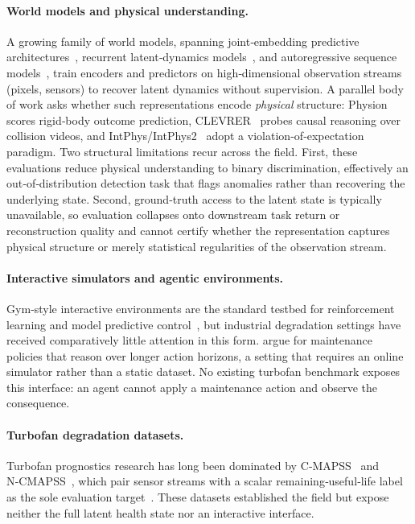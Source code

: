 \documentclass{article}
\begin{document}
\paragraph{World models and physical understanding.}
A growing family of world models, spanning joint‑embedding predictive architectures~\cite{Balestriero_LeCun_2025, Assran_Bardes_Fan_Garrido_Howes_Mojtaba_Komeili_Muckley_Rizvi_Roberts_et_al_2025, Maes_Lidec_Scieur_LeCun_Balestriero_2026}, recurrent latent‑dynamics models~\cite{okada2021dreaming, okada2022dreamingv2}, and autoregressive sequence models~\cite{wang2020data, krishnan2022self, deng2024enhancing, calabrese2021predictive}, train encoders and predictors on high‑dimensional observation streams (pixels, sensors) to recover latent dynamics without supervision. A parallel body of work asks whether such representations encode \emph{physical} structure: Physion~\cite{bear1physion} scores rigid‑body outcome prediction, CLEVRER~\cite{yiclevrer} probes causal reasoning over collision videos, and IntPhys/IntPhys2~\cite{riochet2018intphys, Bordes_Garrido_Kao_Williams_Rabbat_Dupoux_2025} adopt a violation‑of‑expectation paradigm. Two structural limitations recur across the field. First, these evaluations reduce physical understanding to binary discrimination, effectively an out‑of‑distribution detection task that flags anomalies rather than recovering the underlying state. Second, ground‑truth access to the latent state is typically unavailable, so evaluation collapses onto downstream task return or reconstruction quality and cannot certify whether the representation captures physical structure or merely statistical regularities of the observation stream.

\paragraph{Interactive simulators and agentic environments.}
Gym‑style interactive environments are the standard testbed for reinforcement learning and model predictive control~\cite{towers2024gymnasium, todorov2012mujoco}, but industrial degradation settings have received comparatively little attention in this form. \citet{Maulana_Starr_Ompusunggu_2023} argue for maintenance policies that reason over longer action horizons, a setting that requires an online simulator rather than a static dataset. No existing turbofan benchmark exposes this interface: an agent cannot apply a maintenance action and observe the consequence.

\paragraph{Turbofan degradation datasets.}
Turbofan prognostics research has long been dominated by C‑MAPSS~\cite{Saxena_Goebel_Simon_Eklund_2008} and N‑CMAPSS~\cite{Arias_Chao_Kulkarni_Goebel_Fink_2021}, which pair sensor streams with a scalar remaining‑useful‑life label as the sole evaluation target~\cite{Ramasso_Saxena}. These datasets established the field but expose neither the full latent health state nor an interactive interface.
\end{document}
